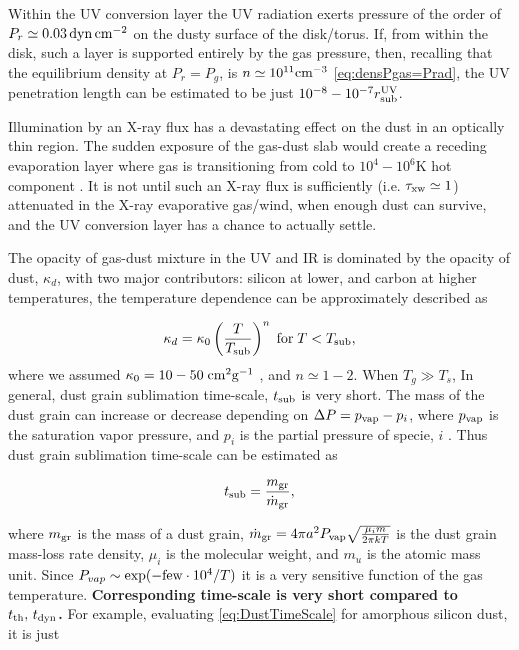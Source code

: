 \documentclass[12pt,english,preprint]{aastex}
\newcommand{\mybf}{\bf}
\newcommand{\su}[2]{#1_{\rm #2}}
\newcommand{\Tsub}{ \su{T}{sub} }
\begin{document}
{
Within the UV conversion layer
the UV radiation exerts pressure
of the order of $P_r\simeq0.03\, {\rm dyn\,cm^{-2}}$
on the dusty surface of the disk/torus.  
If, from within the disk, such a layer is supported 
entirely by the gas pressure, then, recalling that the equilibrium density at 
$P_r=P_g$, is  $n \simeq10^{11}{\rm cm}^{-3}$ \eqref{eq:densPgas=Prad}, 
the UV penetration length can be estimated to be just $10^{-8}-10^{-7} \su{r}{sub}^{\rm UV}$.

Illumination by
an X-ray flux has a devastating effect on the dust in an optically 
thin region. The sudden exposure of the gas-dust 
slab would create a receding evaporation layer where gas is transitioning from 
cold to $10^4-10^6$K hot component \citep[i.e.][]{Dorodnitsyn08b}.
It is not until such an X-ray flux is sufficiently
(i.e. $\tau_{{\rm xw}}\simeq1$) attenuated in the X-ray evaporative
gas/wind, when enough dust can survive, and the UV conversion layer
has a chance to actually settle.
}

The opacity of gas-dust mixture in the UV and IR is dominated by the
opacity of dust, $\kappa_{d}$, with two major contributors: silicon
at lower, and carbon at higher temperatures, the temperature dependence
can be approximately described as

\begin{equation}
\kappa_{d}=\kappa_{0}\left(\frac{T}{T_{{\rm sub}}}\right)^{n}\;{\rm for}\;T<T_{{\rm sub}},
\end{equation}
where we assumed $\kappa_{0}=10-50\;{\rm cm}^{2}\textrm{g}^{-1}$
\citep{Semenov03}, and $n\simeq1-2.$ When $T_{g}\gg T_{s}$, In general,
dust grain sublimation time-scale, $t_{{\rm sub}}$ is very short.
The mass of the dust grain can increase or decrease depending on $\Delta P=p_{{\rm vap}}-p_{i}$,
where $p_{{\rm vap}}$ is the saturation vapor pressure, and $p_{i}$
is the partial pressure of specie, $i$ \citep{Phinney89}. Thus dust grain
sublimation time-scale can be estimated as

\begin{equation}
t_{{\rm sub}}=\frac{m_{{\rm gr}}}{\dot{m}_{{\rm gr}}},\label{eq:DustTimeScale}
\end{equation}

\noindent where $m_{{\rm gr}}$ is the mass of a dust grain, $\dot{m}_{{\rm gr}}=4\pi a^{2}P_{{\rm vap}}\sqrt{\frac{\mu_{i}m}{2\pi kT}}$
is the dust grain mass-loss rate density, $\mu_{i}$ is the molecular
weight, and $m_{u}$ is the atomic mass unit. Since $P_{vap}\sim\exp(-{\rm few}\cdot10^{4}/T)$
it is a very sensitive function of the gas temperature. {\mybf Corresponding 
time-scale is very short compared to $\su{t}{th},\,\su{t}{dyn}$.
}For example,
evaluating \eqref{eq:DustTimeScale} for amorphous silicon dust, it
is just
\end{document}
